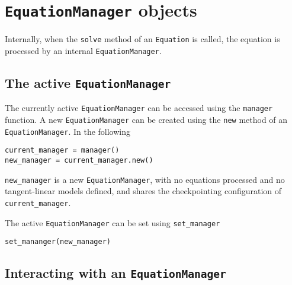 \documentclass[11pt]{article}
\begin{document}
\section{\texttt{EquationManager} objects}\label{sect:EquationManager}

Internally, when the \texttt{solve} method of an \texttt{Equation} is called,
the equation is processed by an internal \texttt{EquationManager}.

\subsection{The active \texttt{EquationManager}}\label{sect:active_EquationManager}

The currently active \texttt{EquationManager} can be accessed using the
\texttt{manager} function. A new \texttt{EquationManager} can be created using
the \texttt{new} method of an \texttt{EquationManager}. In the following
\begin{lstlisting}
current_manager = manager()
new_manager = current_manager.new()
\end{lstlisting}
\texttt{new\_manager} is a new \texttt{EquationManager}, with no equations
processed and no tangent-linear models defined, and shares the checkpointing
configuration of \texttt{current\_manager}.

The active \texttt{EquationManager} can be set using
\texttt{set\_manager}
\begin{lstlisting}
set_mananger(new_manager)
\end{lstlisting}

\subsection{Interacting with an \texttt{EquationManager}}
\end{document}
